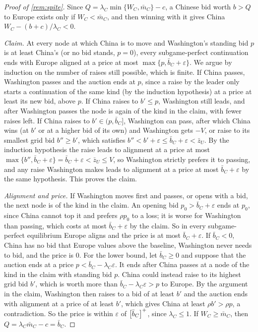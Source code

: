 \begin{proof}[Proof of \cref{rem:spite}]
Since $Q=\lambda_C\min\{W_C,\bar m_C\}-c$, a Chinese bid worth $b>Q$ to Europe exists only if $W_C<\bar m_C$, and then winning with it gives China $W_C-(b+c)/\lambda_C<0$.

\emph{Claim.} At every node at which China is to move and Washington's standing bid $p$ is at least China's (or no bid stands, $p=0$), every subgame-perfect continuation ends with Europe aligned at a price at most $\max\{p,\bar b_C+\varepsilon\}$. We argue by induction on the number of raises still possible, which is finite. If China passes, Washington passes and the auction ends at $p$, since a raise by the leader only starts a continuation of the same kind (by the induction hypothesis) at a price at least its new bid, above $p$. If China raises to $b'\le p$, Washington still leads, and after Washington passes the node is again of the kind in the claim, with fewer raises left. If China raises to $b'\in(p,\bar b_C]$, Washington can pass, after which China wins (at $b'$ or at a higher bid of its own) and Washington gets $-V$, or raise to its smallest grid bid $b''\ge b'$, which satisfies $b''<b'+\varepsilon\le\bar b_C+\varepsilon<\bar z_U$. By the induction hypothesis the raise leads to alignment at a price at most $\max\{b'',\bar b_C+\varepsilon\}=\bar b_C+\varepsilon<\bar z_U\le V$, so Washington strictly prefers it to passing, and any raise Washington makes leads to alignment at a price at most $\bar b_C+\varepsilon$ by the same hypothesis. This proves the claim.

\emph{Alignment and price.} If Washington moves first and passes, or opens with a bid, the next node is of the kind in the claim. An opening bid $p_0>\bar b_C+\varepsilon$ ends at $p_0$, since China cannot top it and prefers $\rho p_0$ to a loss; it is worse for Washington than passing, which costs at most $\bar b_C+\varepsilon$ by the claim. So in every subgame-perfect equilibrium Europe aligns and the price is at most $\bar b_C+\varepsilon$. If $\bar b_C<0$, China has no bid that Europe values above the baseline, Washington never needs to bid, and the price is $0$. For the lower bound, let $\bar b_C\ge 0$ and suppose that the auction ends at a price $p<\bar b_C-\lambda_C\varepsilon$. It ends after China passes at a node of the kind in the claim with standing bid $p$. China could instead raise to its highest grid bid $b'$, which is worth more than $\bar b_C-\lambda_C\varepsilon>p$ to Europe. By the argument in the claim, Washington then raises to a bid of at least $b'$ and the auction ends with alignment at a price of at least $b'$, which gives China at least $\rho b'>\rho p$, a contradiction. So the price is within $\varepsilon$ of $\left[\bar b_C\right]^{+}$, since $\lambda_C\le 1$. If $W_C\ge\bar m_C$, then $Q=\lambda_C\bar m_C-c=\bar b_C$.
\end{proof}

